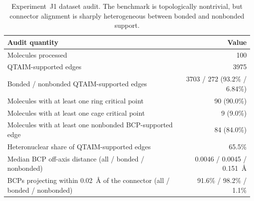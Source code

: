 \begin{table}[t]
\caption{Experiment~J1 dataset audit. The benchmark is topologically nontrivial, but connector alignment is sharply heterogeneous between bonded and nonbonded support.}
\label{tab:j1_dataset_audit}
\centering
\footnotesize
\setlength{\tabcolsep}{5pt}
\renewcommand{\arraystretch}{1.12}
\begin{tabular}{>{\raggedright\arraybackslash}p{}r}
\toprule
Audit quantity & Value \\
\midrule
Molecules processed & 100 \\
QTAIM-supported edges & 3975 \\
Bonded / nonbonded QTAIM-supported edges & 3703 / 272 (93.2\% / 6.84\%) \\
Molecules with at least one ring critical point & 90 (90.0\%) \\
Molecules with at least one cage critical point & 9 (9.0\%) \\
Molecules with at least one nonbonded BCP-supported edge & 84 (84.0\%) \\
Heteronuclear share of QTAIM-supported edges & 65.5\% \\
Median BCP off-axis distance (all / bonded / nonbonded) & 0.0046 / 0.0045 / 0.151~\AA{} \\
BCPs projecting within 0.02~\AA{} of the connector (all / bonded / nonbonded) & 91.6\% / 98.2\% / 1.1\% \\
\bottomrule
\end{tabular}
\end{table}
